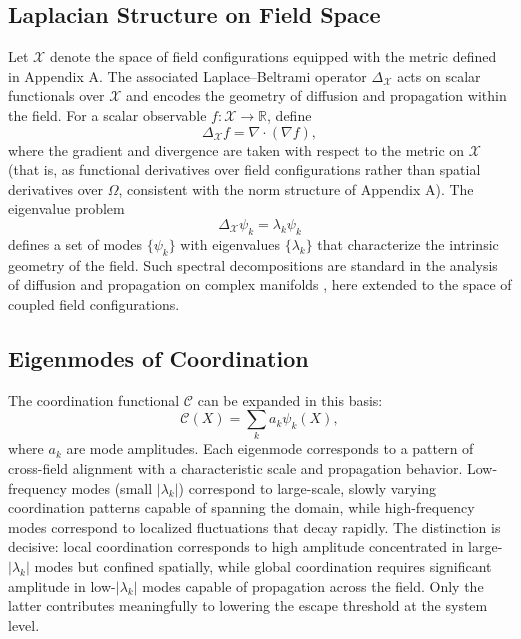 \documentclass[11pt, a4paper]{article}
\begin{document}
\subsection{Laplacian Structure on Field Space}

Let $\mathcal{X}$ denote the space of field configurations equipped with the metric defined in Appendix A. The associated Laplace--Beltrami operator $\Delta_{\mathcal{X}}$ acts on scalar functionals over $\mathcal{X}$ and encodes the geometry of diffusion and propagation within the field. For a scalar observable $f : \mathcal{X} \to \mathbb{R}$, define
\begin{equation}
\Delta_{\mathcal{X}} f = \nabla \cdot (\nabla f),
\end{equation}
where the gradient and divergence are taken with respect to the metric on $\mathcal{X}$ (that is, as functional derivatives over field configurations rather than spatial derivatives over $\Omega$, consistent with the norm structure of Appendix A). The eigenvalue problem
\begin{equation}
\Delta_{\mathcal{X}} \psi_k = \lambda_k \psi_k
\end{equation}
defines a set of modes $\{\psi_k\}$ with eigenvalues $\{\lambda_k\}$ that characterize the intrinsic geometry of the field. Such spectral decompositions are standard in the analysis of diffusion and propagation on complex manifolds \cite{ott2002}, here extended to the space of coupled field configurations.

\subsection{Eigenmodes of Coordination}

The coordination functional $\mathcal{C}$ can be expanded in this basis:
\begin{equation}
\mathcal{C}(X) = \sum_k a_k \psi_k(X),
\end{equation}
where $a_k$ are mode amplitudes. Each eigenmode corresponds to a pattern of cross-field alignment with a characteristic scale and propagation behavior. Low-frequency modes (small $|\lambda_k|$) correspond to large-scale, slowly varying coordination patterns capable of spanning the domain, while high-frequency modes correspond to localized fluctuations that decay rapidly. The distinction is decisive: local coordination corresponds to high amplitude concentrated in large-$|\lambda_k|$ modes but confined spatially, while global coordination requires significant amplitude in low-$|\lambda_k|$ modes capable of propagation across the field. Only the latter contributes meaningfully to lowering the escape threshold at the system level.
\end{document}
